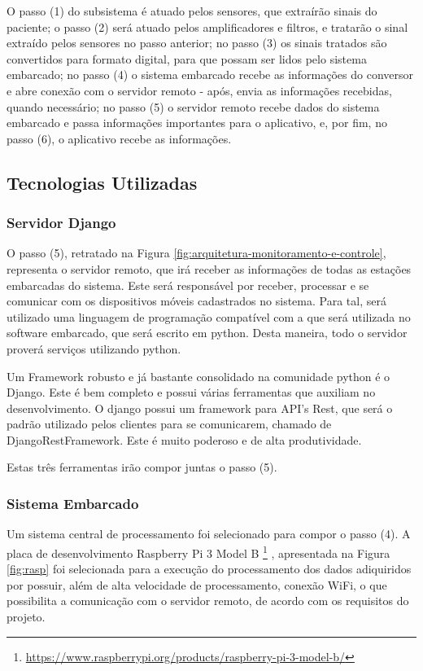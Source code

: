O passo (1) do subsistema é atuado pelos sensores, que extraírão sinais do paciente;
o passo (2) será atuado pelos amplificadores e filtros, e tratarão o sinal
extraído pelos sensores no passo anterior; no passo (3) os sinais tratados
são convertidos para formato digital, para que possam ser lidos pelo sistema
embarcado; no passo (4) o sistema embarcado recebe as informações do conversor
e abre conexão com o servidor remoto - após, envia as informações recebidas,
quando necessário; no passo (5) o servidor remoto recebe dados do sistema
embarcado e passa informações importantes para o aplicativo, e, por fim,
no passo (6), o aplicativo recebe as informações.

\subsection{Tecnologias Utilizadas}

\subsubsection{Servidor Django}
\label{sub:servidor_django}
O passo (5), retratado na Figura \ref{fig:arquitetura-monitoramento-e-controle},
representa o servidor remoto, que irá receber as informações de todas as
estações embarcadas do sistema. Este será responsável por receber, processar
e se comunicar com os dispositivos móveis cadastrados no sistema. Para tal,
será utilizado uma linguagem de programação compatível com a que será utilizada
no software embarcado, que será escrito em python. Desta maneira, todo
o servidor proverá serviços utilizando python.

Um Framework robusto e já bastante consolidado na comunidade python é o Django.
Este é bem completo e possui várias ferramentas que auxiliam no desenvolvimento.
O django possui um framework para API's Rest, que será o padrão utilizado pelos
clientes para se comunicarem, chamado de DjangoRestFramework. Este é muito poderoso
e de alta produtividade.

Estas três ferramentas irão compor juntas o passo (5).

\subsubsection{Sistema Embarcado}
Um sistema central de processamento foi selecionado para compor o passo (4).
A placa de desenvolvimento Raspberry Pi 3 Model B
\footnote{\url{https://www.raspberrypi.org/products/raspberry-pi-3-model-b/}}
, apresentada na Figura \ref{fig:rasp} foi selecionada para
a execução do processamento dos dados adiquiridos por possuir, além de alta 
velocidade de processamento, conexão WiFi, o que possibilita a comunicação 
com o servidor remoto, de acordo com os requisitos do projeto.

